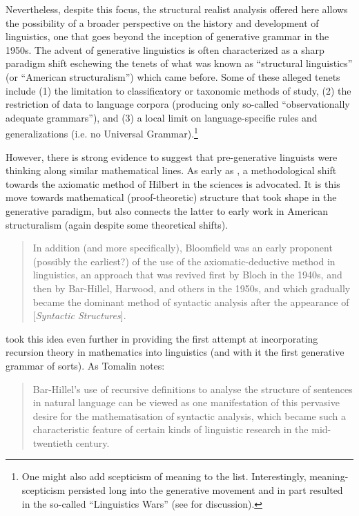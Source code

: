 \documentclass[output=paper]{langscibook}
\begin{document}
Nevertheless, despite this focus, the structural realist analysis offered here allows the possibility of a broader perspective on the history and development of linguistics, one that goes beyond the inception of generative grammar in the 1950s. The advent of generative linguistics is often characterized as a sharp par\-a\-digm shift eschewing the tenets of what was known as ``structural linguistics'' (or ``American structuralism'') which came before. Some of these alleged tenets include (1) the limitation to classificatory or taxonomic methods of study, (2) the restriction of data to language corpora (producing only so-called ``observationally adequate grammars''), and (3) a local limit on language-specific rules and generalizations (i.e. no Universal Grammar).\footnote{One might also add scepticism of meaning to the list. Interestingly, meaning-scepticism persisted long into the generative movement and in part resulted in the so-called ``Linguistics Wars'' (see \citealt{Newmeyer1996} for discussion).}

However, there is strong evidence to suggest that pre-generative linguists were thinking along similar mathematical lines. As early as \cite{Bloomfield1926}, a meth\-od\-o\-logical shift towards the axiomatic method of Hilbert in the sciences is advocated. It is this move towards mathematical (proof-theoretic) structure that took shape in the generative paradigm, but also connects the latter to early work in American structuralism (again despite some theoretical shifts).

\begin{quote}
    In addition (and more specifically), Bloomfield was an early proponent (possibly the earliest?) of the use of the axiomatic-deductive method in linguistics, an approach that was revived first by Bloch in the 1940s, and then by Bar-Hillel, Harwood, and others in the 1950s, and which gradually became the dominant method of syntactic analysis after the appearance of [\emph{Syntactic Structures}]. \citep[184]{Tomalin2006}
\end{quote}


\cite{Bar-Hillel1953} took this idea even further in providing the first attempt at incorporating recursion theory in mathematics into linguistics (and with it the first generative grammar of sorts). As Tomalin notes:

\begin{quote}
    Bar-Hillel's use of recursive definitions to analyse the structure of sentences in natural language can be viewed as one manifestation of this pervasive desire for the mathematisation of syntactic analysis, which became such a characteristic feature of certain kinds of linguistic research in the mid-twentieth century. \citep[67]{Tomalin2006}
\end{quote}
\end{document}
